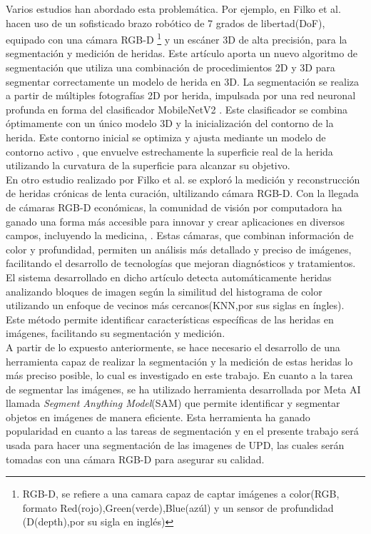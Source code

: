 \documentclass[12pt]{article}
\begin{document}
	 

	
	Varios estudios han abordado esta problem\'atica. Por ejemplo, en Filko et al. \parencite{Filko2023} hacen uso de un sofisticado brazo rob\'otico de 7 grados de libertad(DoF), equipado con una c\'amara RGB-D \footnote{RGB-D, se refiere a una camara capaz de captar im\'agenes a color(RGB, formato Red(rojo),Green(verde),Blue(az\'ul) y un sensor de profundidad (D(depth),por su sigla en ingl\'es)} y un esc\'aner 3D de alta precisi\'on, para la segmentaci\'on y medici\'on de heridas. Este artículo aporta un nuevo algoritmo de segmentación que utiliza una combinación de procedimientos 2D y 3D para segmentar correctamente un modelo de herida en 3D. La segmentación se realiza a partir de múltiples fotografías 2D por herida, impulsada por una red neuronal profunda en forma del clasificador MobileNetV2  \parencite{Filko2023}. Este clasificador se combina óptimamente con un único modelo 3D y la inicialización del contorno de la herida. Este contorno inicial se optimiza y ajusta mediante un modelo de contorno activo \parencite{Filko2023}, que envuelve estrechamente la superficie real de la herida utilizando la curvatura de la superficie para alcanzar su objetivo.
	\\
	
	En otro estudio realizado por Filko et al. \cite{Filko2018} se explor\'o la medici\'on y reconstrucci\'on de heridas cr\'onicas de lenta curaci\'on, ultilizando c\'amara RGB-D. Con la llegada de cámaras RGB-D económicas, la comunidad de visión por computadora ha ganado una forma más accesible para innovar y crear aplicaciones en diversos campos, incluyendo la medicina, \cite{Filko2018}. Estas cámaras, que combinan información de color y profundidad, permiten un análisis más detallado y preciso de imágenes, facilitando el desarrollo de tecnologías que mejoran diagnósticos y tratamientos. El sistema desarrollado en dicho art\'iculo detecta automáticamente heridas analizando bloques de imagen según la similitud del histograma de color utilizando un enfoque de vecinos más cercanos(KNN,por sus siglas en \'ingles). Este método permite identificar características específicas de las heridas en imágenes, facilitando su segmentación y medición.
	\\
	
	A partir de lo expuesto anteriormente, se hace necesario el desarrollo de una herramienta capaz de realizar la segmentaci\'on y la medici\'on de estas heridas lo m\'as preciso posible, lo cual es investigado en este trabajo. En cuanto a la tarea de segmentar las im\'agenes,  se ha utilizado herramienta desarrollada por Meta AI llamada \textit{Segment Anything Model}(SAM)\parencite{segmentanything2023} que permite identificar y segmentar objetos en imágenes de manera eficiente. Esta herramienta ha ganado popularidad en cuanto a las tareas de segmentaci\'on y en el presente trabajo ser\'a usada para hacer una segmentaci\'on de las imagenes de UPD, las cuales ser\'an tomadas con una c\'amara RGB-D para asegurar su calidad.
	\\
	
\end{document}

